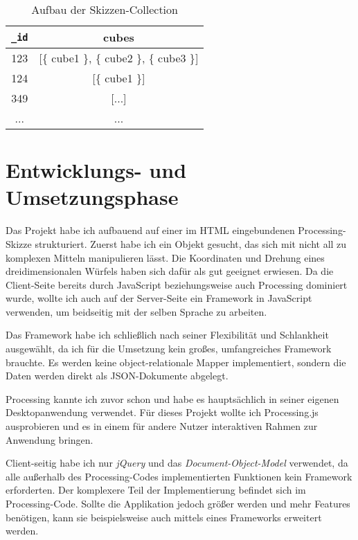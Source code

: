 \documentclass[12pt, ngerman, utf8]{article}
\begin{document}
\begin{table}[htb]
\begin{center}
 \begin{tabular}{|c|c|} 
 \hline
 \verb|_id| & cubes \\ [0.5ex] 
 \hline\hline
 123 & [\{ cube1 \}, \{ cube2 \}, \{ cube3 \}] \\ 
 \hline
 124 & [\{ cube1 \}] \\
 \hline
 349 & [...] \\
 \hline
 ... &  ... \\ [1ex] 
 \hline
\end{tabular}
\end{center}
 \caption{Aufbau der Skizzen-Collection}
\end{table}

\section{Entwicklungs- und Umsetzungsphase}
Das Projekt habe ich aufbauend auf einer im HTML eingebundenen Processing-Skizze strukturiert. Zuerst habe ich ein Objekt gesucht, das sich mit nicht all zu komplexen Mitteln manipulieren lässt. Die Koordinaten und Drehung eines dreidimensionalen Würfels haben sich dafür als gut geeignet erwiesen.
Da die Client-Seite bereits durch JavaScript beziehungsweise auch Processing dominiert wurde, wollte ich auch auf der Server-Seite ein Framework in JavaScript verwenden, um beidseitig mit der selben Sprache zu arbeiten.

Das Framework habe ich schließlich nach seiner Flexibilität und Schlankheit ausgewählt, da ich für die Umsetzung kein großes, umfangreiches Framework brauchte. Es werden keine object-relationale Mapper implementiert, sondern die Daten werden direkt als JSON-Dokumente abgelegt.

Processing kannte ich zuvor schon und habe es hauptsächlich in seiner eigenen Desktopanwendung verwendet. Für dieses Projekt wollte ich Processing.js ausprobieren und es in einem für andere Nutzer interaktiven Rahmen zur Anwendung bringen.

Client-seitig habe ich nur \emph{jQuery} und das \emph{Document-Object-Model} verwendet, da alle außerhalb des Processing-Codes implementierten Funktionen kein Framework erforderten. Der komplexere Teil der Implementierung befindet sich im Processing-Code. Sollte die Applikation jedoch größer werden und mehr Features benötigen, kann sie beispielsweise auch mittels eines Frameworks erweitert werden.
\end{document}
